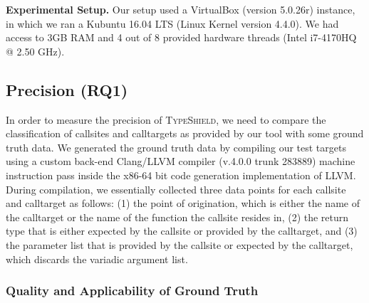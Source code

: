 
\textbf{Experimental Setup.} Our setup used a VirtualBox (version 5.0.26r) instance, in which we ran a Kubuntu 16.04 LTS (Linux Kernel
version 4.4.0). We had access to 3GB RAM and 4 out of 8 provided hardware threads (Intel i7-4170HQ @ 2.50 GHz).

\subsection{Precision (RQ1)}
\label{section:typeshieldprecision}

In order to measure the precision of \textsc{TypeShield}, we need to compare the classification of callsites and calltargets as provided by our tool with 
some ground truth data. We generated the ground truth data by compiling our test targets using a 
custom back-end Clang/LLVM compiler (v.4.0.0 trunk 283889) machine instruction pass inside the x86-64 bit code generation implementation of LLVM. 
During compilation, we essentially collected three data points for each callsite and calltarget as follows:
(1) the point of origination, which is either the name of the calltarget or the name of the function the callsite resides in, 
(2) the return type that is either expected by the callsite or provided by the calltarget, and 
(3) the parameter list that is provided by the callsite or expected by the calltarget, which discards the variadic argument list.

\subsubsection{Quality and Applicability of Ground Truth}
\label{subsection:typeshieldprecision}

\texttt{}

